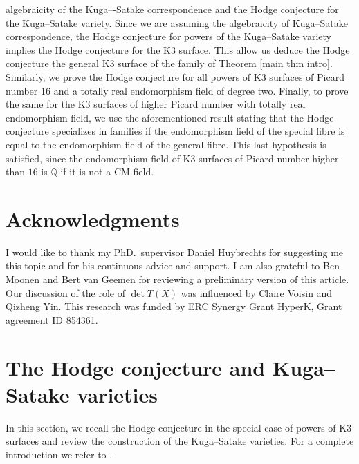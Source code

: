 \documentclass[11pt,twoside,a4paper]{amsart}
\newcommand{\0}{\mathscr{O}}
\newcommand{\Q}{\mathbb{Q}}
\theoremstyle{plain}
\theoremstyle{definition}
\theoremstyle{remark}
\begin{document}
algebraicity of the Kuga–-Satake correspondence and the Hodge conjecture for the Kuga--Satake variety.
Since we are assuming the algebraicity of Kuga--Satake correspondence, the Hodge conjecture for powers of the Kuga--Satake variety implies the Hodge conjecture for the K3 surface. This allow us deduce the Hodge conjecture the general K3 surface of the family of Theorem \ref{main thm intro}. Similarly, we prove the Hodge conjecture for all powers of K3 surfaces of Picard number $16$ and a totally real endomorphism field of degree two. Finally, to prove the same for the K3 surfaces of higher Picard number with totally real endomorphism field, we use the aforementioned result stating that the Hodge conjecture specializes in families if the endomorphism field of the special fibre is equal to the endomorphism field of the general fibre. This last hypothesis is satisfied, since the endomorphism field of K3 surfaces of Picard number higher than $16$ is $\Q$ if it is not a CM field.

\section*{Acknowledgments}
I would like to thank my PhD.\ supervisor Daniel Huybrechts for suggesting me this topic and for his continuous advice and support. I am also grateful to Ben Moonen and Bert van Geemen for reviewing a preliminary version of this article. Our discussion of the role of $\det T(X)$ was influenced by Claire Voisin and Qizheng Yin. This research was funded by ERC Synergy Grant HyperK, Grant
agreement ID 854361.
\section{The Hodge conjecture and Kuga--Satake varieties}
\label{Section Hodge conjecture and Kuga-Satake}
In this section, we recall the Hodge conjecture in the special case of powers of K3 surfaces and review the construction of the Kuga--Satake varieties. For a complete introduction we refer to \cite{huybrechtsK3surfaces}.
\end{document}
